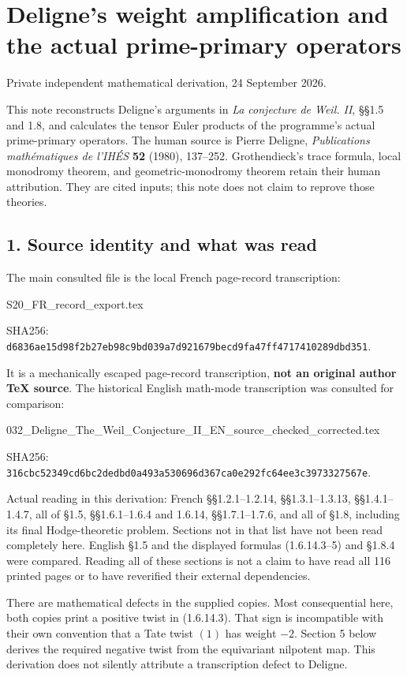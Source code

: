 \section{Deligne's weight amplification and the actual prime-primary
operators}\label{delignes-weight-amplification-and-the-actual-prime-primary-operators}

Private independent mathematical derivation, 24 September 2026.

This note reconstructs Deligne's arguments in \emph{La conjecture de
Weil. II}, §§1.5 and 1.8, and calculates the tensor Euler products of
the programme's actual prime-primary operators. The human source is
Pierre Deligne, \emph{Publications mathématiques de l'IHÉS} \textbf{52}
(1980), 137--252. Grothendieck's trace formula, local monodromy theorem,
and geometric-monodromy theorem retain their human attribution. They are
cited inputs; this note does not claim to reprove those theories.

\subsection{1. Source identity and what was
read}\label{source-identity-and-what-was-read}

The main consulted file is the local French page-record transcription:

S20\_FR\_record\_export.tex

SHA256:
\nolinkurl{d6836ae15d98f2b27eb98c9bd039a7d921679becd9fa47ff4717410289dbd351}.

It is a mechanically escaped page-record transcription, \textbf{not an
original author TeX source}. The historical English math-mode
transcription was consulted for comparison:

032\_Deligne\_The\_Weil\_Conjecture\_II\_EN\_source\_checked\_corrected.tex

SHA256:
\nolinkurl{316cbc52349cd6bc2dedbd0a493a530696d367ca0e292fc64ee3c3973327567e}.

Actual reading in this derivation: French §§1.2.1--1.2.14,
§§1.3.1--1.3.13, §§1.4.1--1.4.7, all of §1.5, §§1.6.1--1.6.4 and 1.6.14,
§§1.7.1--1.7.6, and all of §1.8, including its final Hodge-theoretic
problem. Sections not in that list have not been read completely here.
English §1.5 and the displayed formulas (1.6.14.3--5) and §1.8.4 were
compared. Reading all of these sections is not a claim to have read all
116 printed pages or to have reverified their external dependencies.

There are mathematical defects in the supplied copies. Most
consequential here, both copies print a positive twist in (1.6.14.3).
That sign is incompatible with their own convention that a Tate twist
\((1)\) has weight \(-2\). Section 5 below derives the required negative
twist from the equivariant nilpotent map. This derivation does not
silently attribute a transcription defect to Deligne.

